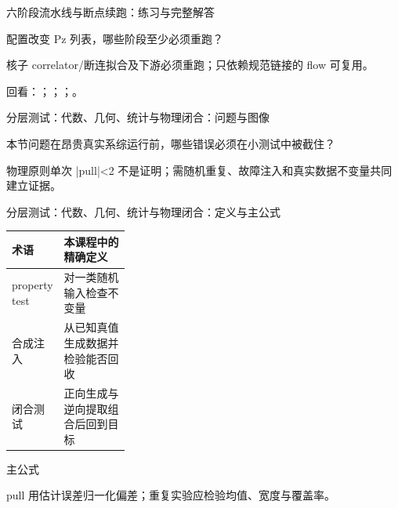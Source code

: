\begin{frame}[t]{六阶段流水线与断点续跑：练习与完整解答}
\footnotesize
\begin{block}{}配置改变 Pz 列表，哪些阶段至少必须重跑？\end{block}
\begin{exampleblock}{}核子 correlator/\allowbreak{}断连拟合及下游必须重跑；只依赖规范链接的 flow 可复用。\end{exampleblock}
\vfill
\scriptsize 回看：；；；。
\end{frame}

\begin{frame}[t]{分层测试：代数、几何、统计与物理闭合：问题与图像}
\footnotesize
\begin{block}{本节问题}在昂贵真实系综运行前，哪些错误必须在小测试中被截住？\end{block}
\begin{block}{物理原则}\quad 单次 |pull|<2 不是证明；需随机重复、故障注入和真实数据不变量共同建立证据。\end{block}
\end{frame}

\begin{frame}[t]{分层测试：代数、几何、统计与物理闭合：定义与主公式}
\footnotesize\begin{tabularx}{\linewidth}{p{0.30\linewidth}Y}
\toprule 术语 & 本课程中的精确定义\\\midrule
{} property test & 对一类随机输入检查不变量\\
 合成注入 & 从已知真值生成数据并检验能否回收\\
 闭合测试 & 正向生成与逆向提取组合后回到目标\\
\bottomrule\end{tabularx}\vspace{0.15cm}
\begin{block}{ 主公式}\centering{}\end{block}
pull 用估计误差归一化偏差；重复实验应检验均值、宽度与覆盖率。
\end{frame}

